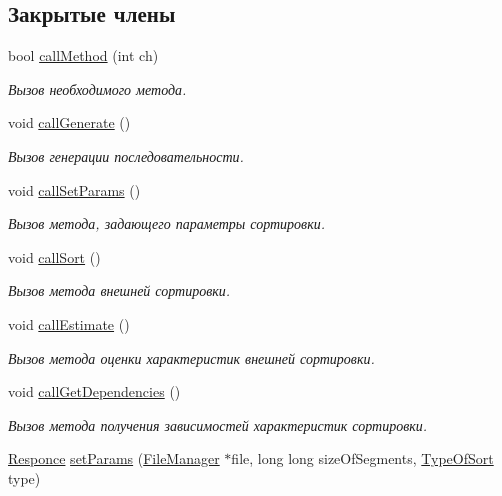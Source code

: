 \subsection*{Закрытые члены}
\begin{DoxyCompactItemize}
\item 
bool \hyperlink{class_user_interface_ad388ff348c0a124038f4ea9756b80041}{call\+Method} (int ch)
\begin{DoxyCompactList}\small\item\em Вызов необходимого метода. \end{DoxyCompactList}\item 
void \hyperlink{class_user_interface_a27c547dadfd5588d5b734e253b2e8a4a}{call\+Generate} ()
\begin{DoxyCompactList}\small\item\em Вызов генерации последовательности. \end{DoxyCompactList}\item 
void \hyperlink{class_user_interface_adcabf6c8f2be4b4ec712c4674156bf59}{call\+Set\+Params} ()
\begin{DoxyCompactList}\small\item\em Вызов метода, задающего параметры сортировки. \end{DoxyCompactList}\item 
void \hyperlink{class_user_interface_a0e03dfecee7e890ad1e076888062d5cb}{call\+Sort} ()
\begin{DoxyCompactList}\small\item\em Вызов метода внешней сортировки. \end{DoxyCompactList}\item 
void \hyperlink{class_user_interface_a7957201b3543ea0561d48bcc0a0d329e}{call\+Estimate} ()
\begin{DoxyCompactList}\small\item\em Вызов метода оценки характеристик внешней сортировки. \end{DoxyCompactList}\item 
void \hyperlink{class_user_interface_a332db63dca89d684f7e9e1272f4c3745}{call\+Get\+Dependencies} ()
\begin{DoxyCompactList}\small\item\em Вызов метода получения зависимостей характеристик сортировки. \end{DoxyCompactList}\item 
\hyperlink{_structures_8h_a9864d6ef28dd6e38416afac4426b3491}{Responce} \hyperlink{class_user_interface_a595a469d83a351719c75c65fbf4a6fbe}{set\+Params} (\hyperlink{class_file_manager}{File\+Manager} $\ast$file, long long size\+Of\+Segments, \hyperlink{_structures_8h_adbb15722785daaf5166f7ea34323854c}{Type\+Of\+Sort} type)

\end{DoxyCompactItemize}
